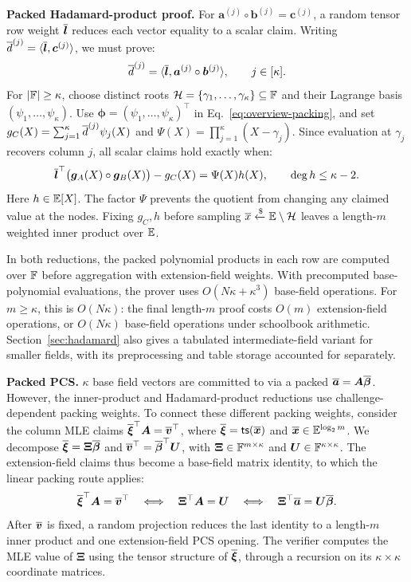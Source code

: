 \medskip\noindent\textbf{Packed Hadamard-product proof.}
For \(\bm a^{(j)}\circ\bm b^{(j)}=\bm c^{(j)}\), a random
tensor row weight \(\overline{\bm l}\) reduces each vector
equality to a scalar claim.
Writing
\(\overline{d}^{(j)}=\langle\overline{\bm l},\bm c^{(j)}\rangle\),
we must prove:
\[
    \overline{d}^{(j)}
       =\langle\overline{\bm l},
          \bm a^{(j)}\circ\bm b^{(j)}\rangle,
       \qquad j\in[\kappa].
\]
For \(|{\mathbb{F}}|\geq\kappa\), choose distinct roots
\(\mathcal H=\{\gamma_1,\ldots,\gamma_\kappa\}\subseteq{\mathbb{F}}\)
and their Lagrange basis \((\psi_1,\ldots,\psi_\kappa)\).
Use \(\bm\phi=(\psi_1,\ldots,\psi_\kappa)^\top\) in
Eq.~\eqref{eq:overview-packing}, and set
\(g_C(X)=\sum_{j=1}^{\kappa}\overline{d}^{(j)}\psi_j(X)\) and
\(\Psi(X)=\prod_{j=1}^{\kappa}(X-\gamma_j)\).
Since evaluation at \(\gamma_j\) recovers column \(j\),
all scalar claims hold exactly when:
\[
    \overline{\bm l}^{\top}
       \bigl(\bm g_A(X)\circ\bm g_B(X)\bigr)-g_C(X)
       =\Psi(X)h(X),
    \qquad \deg h\leq\kappa-2.
\]
Here \(h\in\mathbb{E}[X]\).
The factor \(\Psi\) prevents the quotient from changing any
claimed value at the nodes.
Fixing \(g_C,h\) before sampling
\(\overline{x}\mathrel{\xleftarrow{\$}}\mathbb{E}\setminus\mathcal H\) leaves
a length-\(m\) weighted inner product over $\mathbb{E}$.

In both reductions, the packed polynomial products in each row are computed over
\({\mathbb{F}}\) before aggregation with extension-field weights.
With precomputed base-polynomial evaluations, the prover uses
\(O(N\kappa+\kappa^3)\) base-field operations.
For \(m\geq\kappa\), this is \(O(N\kappa)\):
the final length-\(m\) proof costs \(O(m)\) extension-field
operations, or \(O(N\kappa)\) base-field operations under
schoolbook arithmetic.
Section~\ref{sec:hadamard} also gives a tabulated
intermediate-field variant for smaller fields, with its
preprocessing and table storage accounted for separately.

\medskip\noindent\textbf{Packed PCS.}
$\kappa$ base field vectors are committed to via a packed
\(\overline{\bm a}=\bm A\overline{\bm\beta}\).
However, the inner-product and Hadamard-product reductions
use challenge-dependent packing weights.
To connect these different packing weights, consider the column MLE claims
\(\overline{\bm\xi}^{\top}\bm A=\overline{\bm v}^{\top}\), where
\(\overline{\bm\xi}={\sf ts}(\overline{\bm x})\) and
\(\overline{\bm x}\in\mathbb{E}^{\log_2m}\).
We decompose
\(\overline{\bm\xi}=\bm\Xi\overline{\bm\beta}\) and
\(\overline{\bm v}^{\top}=\overline{\bm\beta}^{\top}\bm U\),
with \(\bm\Xi\in{\mathbb{F}}^{m\times\kappa}\) and
\(\bm U\in{\mathbb{F}}^{\kappa\times\kappa}\).
The extension-field claims thus become a base-field matrix identity,
to which the linear packing route applies:
\[
    \overline{\bm\xi}^{\top}\bm A=\overline{\bm v}^{\top}
    \quad\Longleftrightarrow\quad
    \bm\Xi^\top\bm A=\bm U
    \quad\Longleftrightarrow\quad
    \bm\Xi^\top\overline{\bm a}=\bm U\overline{\bm\beta}.
\]
After \(\overline{\bm v}\) is fixed, a random projection reduces
the last identity to a length-\(m\) inner product and one
extension-field PCS opening.
The verifier computes the MLE value of $\bm{\Xi}$ using the
tensor structure of \(\overline{\bm\xi}\), through a recursion on its
\(\kappa\times\kappa\) coordinate matrices.

